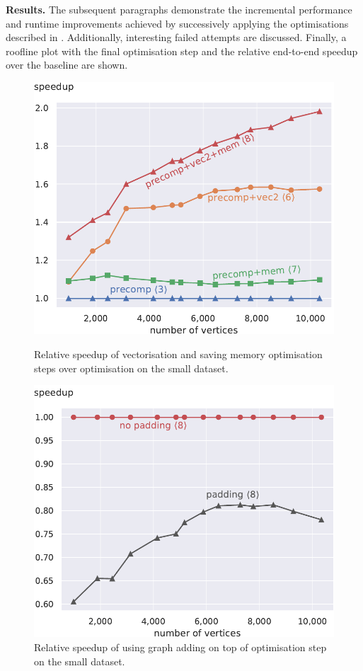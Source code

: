 \documentclass[letterpaper]{article}
\let\cref=\Cref %
\newcommand{\mypar}[1]{{\bf #1.}}
\begin{document}
\mypar{Results}  The subsequent paragraphs demonstrate the incremental performance and runtime improvements achieved by successively applying the optimisations described in \cref{sec:yourmethod}.
Additionally, interesting failed attempts are discussed.  
Finally, a roofline plot with the final optimisation step and the relative end-to-end speedup over the baseline  are shown.

\begin{figure}[!t]
\begin{minipage}[t]{\oldlinewidth}\centering
	\includegraphics[width=\linewidth]{img/speedup[3][6][7][8]_small.pdf}
	\caption{Relative speedup of vectorisation and saving memory optimisation steps over optimisation  on the small dataset. \label{cpctVectSpeedupSmall}}
\end{minipage}%
\hfil
\begin{minipage}[t]{\oldlinewidth}\centering
	\includegraphics[width=\linewidth]{img/speedup[8]padding_small.pdf}
	\caption{Relative speedup of using graph adding on top of optimisation step  on the small dataset. \label{speedupGraphPaddingSmall}}
\end{minipage}%


\end{figure}
\end{document}
